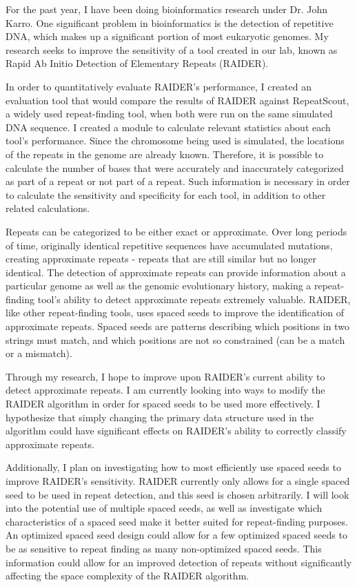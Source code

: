 \documentclass[12pt, doublespace]{article}
\begin{document}
\newcommand\COURSE{Charlotte Schaeffer}
\newcommand\HWNUM{Research Overview}             
For the past year, I have been doing bioinformatics research under Dr. John Karro. One significant problem in bioinformatics is the detection of repetitive DNA, which makes up a significant portion of most eukaryotic genomes. My research seeks to improve the sensitivity of a tool created in our lab, known as Rapid Ab Initio Detection of Elementary Repeats (RAIDER).

In order to quantitatively evaluate RAIDER's performance, I created an evaluation tool that would compare the results of RAIDER against RepeatScout, a widely used repeat-finding tool, when both were run on the same simulated DNA sequence. I created a module to calculate relevant statistics about each tool's performance. Since the chromosome being used is simulated, the locations of the repeats in the genome are already known. Therefore, it is possible to calculate the number of bases that were accurately and inaccurately categorized as part of a repeat or not part of a repeat. Such information is necessary in order to calculate the sensitivity  and specificity for each tool, in addition to other related calculations.

Repeats can be categorized to be either exact or approximate. Over long periods of time, originally identical repetitive sequences have accumulated mutations, creating approximate repeats - repeats that are still similar but no longer identical. The detection of approximate repeats can provide information about a particular genome as well as the genomic evolutionary history, making a repeat-finding tool's ability to detect approximate repeats extremely valuable. RAIDER, like other repeat-finding tools, uses spaced seeds to improve the identification of approximate repeats. Spaced seeds are patterns describing which positions in two strings must match, and which positions are not so constrained (can be a match or a mismatch). 

Through my research, I hope to improve upon RAIDER's current ability to detect approximate repeats. I am currently looking into ways to modify the RAIDER algorithm in order for spaced seeds to be used more effectively. I hypothesize that simply changing the primary data structure used in the algorithm could have significant effects on RAIDER's ability to correctly classify approximate repeats. 

Additionally, I plan on investigating how to most efficiently use spaced seeds to improve RAIDER's sensitivity. RAIDER currently only allows for a single spaced seed to be used in repeat detection, and this seed is chosen arbitrarily. I will look into the potential use of multiple spaced seeds, as well as investigate which characteristics of a spaced seed make it better suited for repeat-finding purposes. An  optimized spaced seed design could allow for a few optimized spaced seeds to be as sensitive to repeat finding as many non-optimized spaced seeds. This information could allow for an improved detection of repeats without significantly affecting the space complexity of the RAIDER algorithm.
\end{document}
